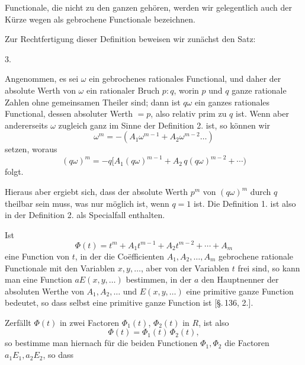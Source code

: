 
Functionale, die nicht zu den ganzen gehören, werden wir gelegentlich auch der Kürze wegen als gebrochene Functionale bezeichnen.

Zur Rechtfertigung dieser Definition beweisen wir zunächst den Satz:

3. 

Angenommen, es sei $\omega$ ein gebrochenes rationales Functional, und daher der absolute Werth von $\omega$ ein rationaler Bruch $p:q$, worin $p$ und $q$ ganze rationale Zahlen ohne gemeinsamen Theiler sind; dann ist $q\omega$ ein ganzes rationales Functional, dessen absoluter Werth $=p$, also relativ prim zu $q$ ist. Wenn aber andererseits $\omega$ zugleich ganz im Sinne der Definition 2. ist, so können wir
\[
\omega^m = -(A_1\omega^{m-1} + A_2\omega^{m-2} \ldots)
\]
setzen, woraus
\[
(q\omega)^m = -q[A_1(q\omega)^{m-1} + A_2\,q(q\omega)^{m-2} + \cdots) %
\]
folgt.

Hieraus aber ergiebt sich, dass der absolute Werth $p^m$ von $(q\omega)^m$ durch $q$ theilbar sein muss, was nur möglich ist, wenn $q=1$ ist. Die Definition 1. ist also in der Definition 2. als Specialfall enthalten.

Ist
\[
\Phi(t) = t^m + A_1t^{m-1} + A_2t^{m-2} + \cdots + A_m
\]
eine Function von $t$, in der die Coëfficienten $A_1, A_2, \ldots, A_m$ gebrochene rationale Functionale mit den Variablen $x, y, \ldots$, aber von der Variablen $t$ frei sind, so kann man eine Function $aE(x,y,\ldots)$ bestimmen, in der $a$ den Hauptnenner der absoluten Werthe von $A_1, A_2, \ldots$ und $E(x,y,\ldots)$ eine primitive ganze Function bedeutet, so dass
selbst eine primitive ganze Function ist [§.\,136, 2.].

Zerfällt $\Phi(t)$ in zwei Factoren $\Phi_1(t)$, $\Phi_2(t)$ in $R$, ist also
\[
\Phi(t) = \Phi_1(t)\,\Phi_2(t),
\]
so bestimme man hiernach für die beiden Functionen $\Phi_1, \Phi_2$ die Factoren $a_1E_1, a_2E_2$, so dass
